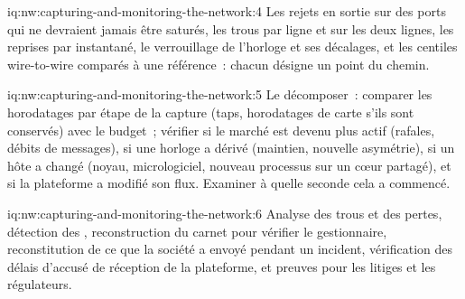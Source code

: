 \begin{solution}{iq:nw:capturing-and-monitoring-the-network:4}
Les rejets en sortie sur des ports qui ne devraient jamais être saturés, les trous par ligne et sur les deux lignes, les reprises par instantané, le verrouillage de l'horloge et ses décalages, et
les centiles wire-to-wire comparés à une référence~: chacun désigne un point du chemin.
\end{solution}

\begin{solution}{iq:nw:capturing-and-monitoring-the-network:5}
Le décomposer~: comparer les horodatages par étape de la capture (taps, horodatages de carte s'ils sont conservés) avec le budget~; vérifier si le marché est devenu plus actif
(rafales, débits de messages), si une horloge a dérivé (maintien, nouvelle asymétrie), si un hôte a changé (noyau, micrologiciel, nouveau processus sur un
cœur partagé), et si la plateforme a modifié son flux. Examiner à quelle seconde cela a commencé.
\end{solution}

\begin{solution}{iq:nw:capturing-and-monitoring-the-network:6}
Analyse des trous et des pertes, détection des , reconstruction du carnet pour vérifier le gestionnaire, reconstitution de ce que la société a envoyé pendant un incident,
vérification des délais d'accusé de réception de la plateforme, et preuves pour les litiges et les régulateurs.
\end{solution}
